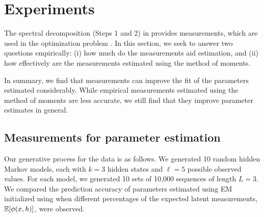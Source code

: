 \section{Experiments} \label{sec:experiments}

The spectral decomposition (Steps 1 and 2) in 
provides measurements,
which are used in the optimization problem .
In this section, we
seek to answer two questions empirically:
(i) how much do the measurements aid estimation, and
(ii) how effectively are the measurements estimated using the
method of moments.

In summary, we find that measurements can improve the fit of the
parameters estimated considerably.
While empirical measurements estimated using the
method of moments are less accurate, we still find that they improve
parameter estimates in general.

\subsection{Measurements for parameter estimation}

Our generative process for the data is as follows.
We generated 10 random hidden Markov models,
each with $k=3$ hidden states and $\ell=5$ possible observed values. 
For each model, we generated 10 sets of 10,000 sequences of length $L=3$.
We compared the prediction accuracy of parameters estimated using EM
initialized using  when different percentages of the expected
latent measurements, $\mathbb{E}[\phi(x,h)]$, were observed.


